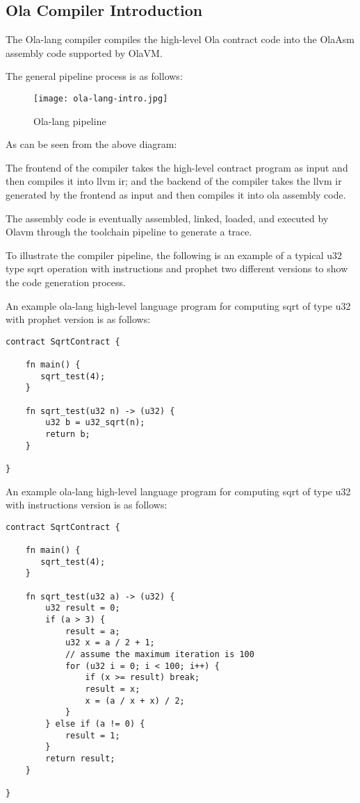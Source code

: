\subsection{Ola Compiler Introduction}

The Ola-lang compiler compiles the high-level Ola contract code into the OlaAsm assembly code supported by OlaVM. 

The general pipeline process is as follows:

\begin{figure}[!htp]
    \centering
    \texttt{[image: ola-lang-intro.jpg]}
    \caption{Ola-lang pipeline}
    \label{fig:ola-lang-intro}
\end{figure}

As can be seen from the above diagram:

The frontend of the compiler takes the high-level contract program as input and then compiles it into llvm ir;
and the backend of the compiler takes the llvm ir generated by the frontend as input and then compiles it into ola assembly code.

The assembly code is eventually assembled, linked, loaded, and executed by Olavm through the toolchain pipeline to generate a trace.


To illustrate the compiler pipeline, the following is an example of a typical u32 type sqrt operation with instructions and prophet two different versions to show the code generation process.

An example ola-lang high-level language program for computing sqrt of type u32 with prophet version is as follows:
\begin{lstlisting}[language={}]
contract SqrtContract {

    fn main() {
       sqrt_test(4);
    }

    fn sqrt_test(u32 n) -> (u32) {
        u32 b = u32_sqrt(n);
        return b;
    }

}
\end{lstlisting}


An example ola-lang high-level language program for computing sqrt of type u32 with instructions version is as follows:
\begin{lstlisting}[language={}]
contract SqrtContract {

    fn main() {
       sqrt_test(4);
    }

    fn sqrt_test(u32 a) -> (u32) {
        u32 result = 0;
        if (a > 3) {
            result = a;
            u32 x = a / 2 + 1;
            // assume the maximum iteration is 100
            for (u32 i = 0; i < 100; i++) {
                if (x >= result) break;
                result = x;
                x = (a / x + x) / 2;
            }
        } else if (a != 0) {
            result = 1;
        }
        return result;
    }

}
\end{lstlisting}
